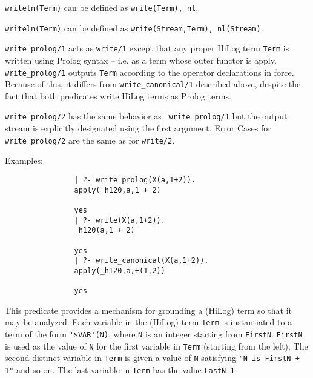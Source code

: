\begin{description}
    {\tt writeln(Term)} can be defined as {\tt write(Term), nl}.

    {\tt writeln(Term)} can be defined as {\tt write(Stream,Term),
    nl(Stream)}.


%
   {\tt write\_prolog/1} acts as {\tt write/1} except that any proper
   HiLog term {\tt Term} is written using Prolog syntax -- i.e. as a
   term whose outer functor is apply.  {\tt write\_prolog/1} outputs
   {\tt Term} according to the operator declarations in force.
   Because of this, it differs from {\tt write\_canonical/1} described
   above, despite the fact that both predicates write HiLog terms as
   Prolog terms.

   {\tt write\_prolog/2} has the same behavior as {\tt
     write\_prolog/1} but the output stream is explicitly designated
   using the first argument.  Error Cases for {\tt write\_prolog/2}
   are the same as for {\tt write/2}.

    Examples:
    {\footnotesize
     \begin{verbatim}
                | ?- write_prolog(X(a,1+2)).
                apply(_h120,a,1 + 2)

                yes
                | ?- write(X(a,1+2)).
                _h120(a,1 + 2)

                yes
                | ?- write_canonical(X(a,1+2)).
                apply(_h120,a,+(1,2))

                yes
     \end{verbatim}}


%
This predicate provides a mechanism for grounding a (HiLog) term so
that it may be analyzed.  Each variable in the (HiLog) term {\tt Term}
is instantiated to a term of the form \verb|'$VAR'(N)|, where {\tt N}
is an integer starting from {\tt FirstN}.  {\tt FirstN} is used as the
value of {\tt N} for the first variable in {\tt Term} (starting from
the left). The second distinct variable in {\tt Term} is given a value
of {\tt N} satisfying {\tt "N is FirstN + 1"} and so on.  The last
variable in {\tt Term} has the value {\tt LastN-1}.


\end{description}
